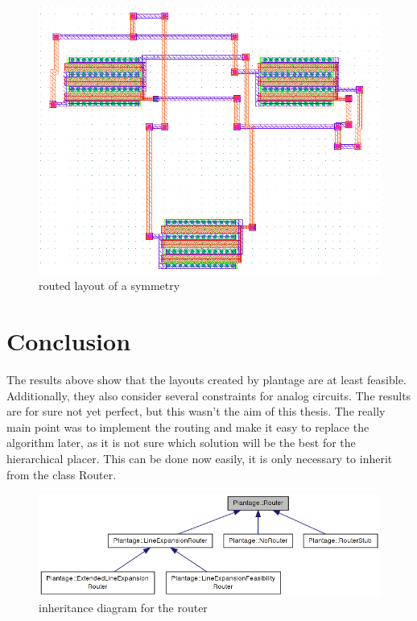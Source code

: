 \begin{figure}
	\centering
	\includegraphics[scale=.4]{FIG/symmetry_routed.png}
  	\caption{routed layout of a symmetry}
	\label{fig:symmetry_routed}
\end{figure}

\section{Conclusion}
The results above show that the layouts created by plantage are at least feasible. Additionally, they also consider several constraints for analog circuits. The results are for sure not yet perfect, but this wasn't the aim of this thesis. The really main point was to implement the routing and make it easy to replace the algorithm later, as it is not sure which solution will be the best for the hierarchical placer. This can be done now easily, it is only necessary to inherit from the class Router.

\begin{figure}
	\centering
	\includegraphics[scale=.6]{FIG/class_diagram_router.png}
  	\caption{inheritance diagram for the router}
	\label{fig:class_diagram_router}
\end{figure}

